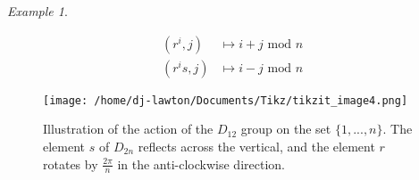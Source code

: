 \documentclass{article}
\theoremstyle{definition}
\theoremstyle{remark}
\newtheorem*{example}{Example}
\begin{document}
\begin{example}
\begin{enumerate}
\begin{align*}
(r^i,j)&\mapsto i+j \text{ mod }n\\
(r^is,j)&\mapsto i-j\text{ mod }n
\end{align*}
\begin{figure}[H]
\begin{center}
\texttt{[image: /home/dj-lawton/Documents/Tikz/tikzit\_image4.png]}
\caption{\label{fig: Dihedral}Illustration of the action of the $D_{12}$ group on the set $\lbrace 1,...,n\rbrace$. The element $s$ of $D_{2n}$ reflects across the vertical, and the element $r$ rotates by $\frac{2\pi}{n}$ in the anti-clockwise direction. }
\end{center}
\end{figure}
\end{enumerate}
\end{example}
\newpage
\end{document}

